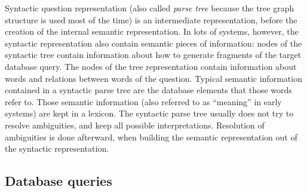\documentclass[10pt,journal,letterpaper,compsoc]{IEEEtran}
\newcommand\TODO[1]{{\textcolor{red}{TODO:#1\\}}}
\begin{document}
Syntactic question representation (also called {\it parse tree} because the
tree graph structure is used most of the time) is an intermediate
representation, before the creation of the internal semantic representation. In
lots of systems, however, the syntactic representation also contain semantic
pieces of information: nodes of the syntactic tree contain information about how
to generate fragments of the target database query. 
The nodes of the tree representation contain information about words and
relations between words of the question. 
Typical semantic information contained in a syntactic parse tree are the
database elements that those words refer to. 
Those semantic information (also referred to as ``meaning'' in early systems)
are kept in a lexicon. 
The syntactic parse tree usually does not try to resolve
ambiguities, and keep all possible interpretations. Resolution of ambiguities
is done afterward, when building the semantic representation out of the
syntactic representation.







\subsection{Database queries}
\label{sec:big-picture-semantic}
\end{document}
